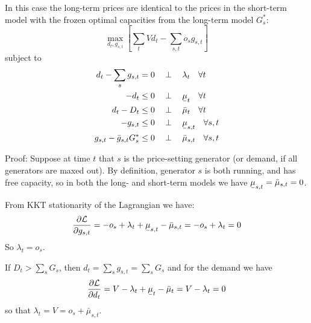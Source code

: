 \documentclass[final,3p,times]{elsarticle}
\newcommand{\ubar}[1]{\text{\b{$#1$}}}
\def\l{\lambda}
\def\d{\partial}
\def\cL{\mathcal{L}}
\begin{document}
In this case the long-term prices are identical to the prices in the short-term model with the frozen optimal capacities from the long-term model $G_{s}^*$:
\begin{equation}
    \max_{d_{t}, g_{s,t}}\left[\sum_{t} V d_{t}  - \sum_{s,t} o_{s} g_{s,t} \right]  \label{eq:objs}
\end{equation}
subject to
\begin{align}
   d_{t} - \sum_s g_{s,t} & =  0 \hspace{0.34cm}\perp \hspace{0.34cm} \l_t \hspace{0.34cm} \forall t \label{eq:balance2}\\
    -d_{t} & \leq 0 \hspace{0.34cm}\perp \hspace{0.34cm} \ubar{\mu}_{t} \hspace{0.34cm} \forall t  \nonumber \\
    d_{t} - D_{t} & \leq 0 \hspace{0.34cm}\perp \hspace{0.34cm} \bar{\mu}_{t} \hspace{0.34cm} \forall t\nonumber  \\
    -g_{s,t} & \leq 0 \hspace{0.34cm}\perp \hspace{0.34cm} \ubar{\mu}_{s,t} \hspace{0.34cm} \forall s,t \nonumber \\
         g_{s,t} - \bar{g}_{s,t} G^*_s & \leq 0 \hspace{0.34cm}\perp \hspace{0.34cm} \bar{\mu}_{s,t} \hspace{0.34cm} \forall s,t \label{eq:generation}
\end{align}

Proof: Suppose at time $t$ that $s$ is the price-setting generator (or demand, if all generators are maxed out). By definition, generator $s$ is both running, and has free capacity, so in both the long- and short-term models we have $\ubar{\mu}_{s,t} = \bar{\mu}_{s,t} = 0$.

From KKT stationarity of the Lagrangian we have:
\begin{align}
\frac{\d \cL}{\d g_{s,t}} =  -o_s + \l_t + \ubar{\mu}_{s,t} - \bar{\mu}_{s,t}  =  -o_s + \l_t = 0
\end{align}
So $\l_t = o_s$.

If $D_t > \sum_s G_{s}$, then $d_t = \sum_s g_{s,t} = \sum_s G_{s}$ and for the demand we have
\begin{align}
\frac{\d \cL}{\d d_{t}} =  V -\l_t + \ubar{\mu}_{t} - \bar{\mu}_{t}  =  V - \l_t = 0
\end{align}
so that $\l_t = V = o_s + \bar{\mu}_{s,t}$.
\end{document}
